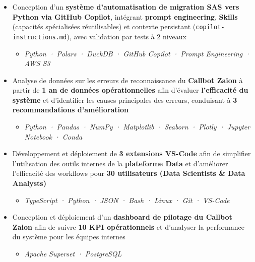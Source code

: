 \documentclass[10pt,english,french]{article}
\begin{document}
\begin{itemize}[leftmargin=0.5cm, label=\textbullet, itemsep=0.0625em]
    \item Conception d'un \textbf{système d'automatisation de migration SAS
              vers Python via GitHub Copilot}, intégrant \textbf{prompt engineering},
          \textbf{Skills} (capacités spécialisées réutilisables) et contexte persistant
          (\texttt{copilot-instructions.md}), avec validation par tests à 2 niveaux
          \begin{itemize}[leftmargin=0.25cm,label=\textendash,itemsep=0em,topsep=0.2em]
              \item \textit{\fontsize{10pt}{9pt}\selectfont Python · Polars · DuckDB · GitHub Copilot · Prompt Engineering · AWS S3}
          \end{itemize}

    \item Analyse de données sur les erreurs de reconnaissance du \textbf{Callbot Zaion}
          à partir de \textbf{1 an de données opérationnelles} afin d'évaluer
          \textbf{l'efficacité du système} et d'identifier les causes principales des
          erreurs, conduisant à \textbf{3 recommandations d'amélioration}
          \begin{itemize}[leftmargin=0.25cm,label=\textendash,itemsep=0em,topsep=0.2em]
              \item \textit{\fontsize{10pt}{9pt}\selectfont Python · Pandas · NumPy · Matplotlib · Seaborn · Plotly · Jupyter Notebook · Conda}
          \end{itemize}

    \item Développement et déploiement de \textbf{3 extensions VS-Code} afin de
          simplifier l'utilisation des outils internes de la \textbf{plateforme Data} et
          d'améliorer l'efficacité des workflows pour \textbf{30\raisebox{0.20ex}{\small
                  +} utilisateurs (Data Scientists \& Data Analysts)}
          \begin{itemize}[leftmargin=0.25cm,label=\textendash,itemsep=0em,topsep=0.2em]
              \item \textit{\fontsize{10pt}{9pt}\selectfont TypeScript · Python · JSON · Bash · Linux · Git · VS-Code}
          \end{itemize}

    \item Conception et déploiement d'un \textbf{dashboard de pilotage du Callbot Zaion}
          afin de suivre \textbf{10\raisebox{0.20ex}{\small +} KPI opérationnels} et
          d'analyser la performance du système pour les équipes internes
          \begin{itemize}[leftmargin=0.25cm,label=\textendash,itemsep=0em,topsep=0.2em]
              \item \textit{\fontsize{10pt}{9pt}\selectfont Apache Superset · PostgreSQL}
          \end{itemize}


\end{itemize}
\end{document}
